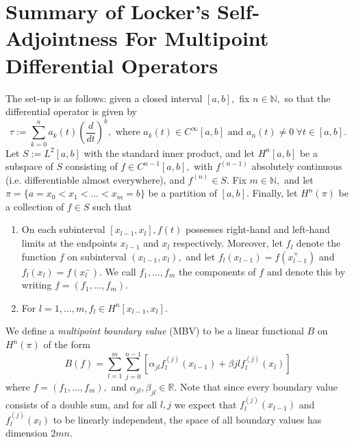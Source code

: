 \documentclass[11pt,reqno,oneside,a4paper]{article}
\begin{document}
	
\section*{Summary of Locker's Self-Adjointness For Multipoint Differential Operators}
The set-up is as follows: given a closed interval $[a,b],$ fix $n\in\mathbb{N},$ so that the differential operator is given by 
\[ 
\tau  := \sum^n_{k=0} a_k(t)\left( \frac{d}{dt}\right)^k, \mbox{ where } a_k(t) \in C^{\infty}[a,b] \mbox{ and } a_n(t) \neq 0~ \forall t \in [a,b].
\]
Let $S := L^2[a,b]$ with the standard inner product, and let $H^n[a,b]$ be a subspace of $S$ consisting of $f\in C^{n-1}[a,b],$ with $f^{(n-1)}$ absolutely continuous (i.e. differentiable almost everywhere), and $f^{(n)} \in S.$ Fix $m \in \mathbb{N},$ and let $\pi = \{ a = x_0 < x_1 < \ldots < x_m = b \}$ be a partition of $[a,b].$ Finally, let $H^n(\pi)$ be a collection of $f \in S$ such that 
\begin{enumerate}
\item On each subinterval $[x_{l-1}, x_l], f(t)$ possesses right-hand and left-hand limits at the endpoints $x_{l-1}$ and $x_{l}$ respectively. Moreover, let $f_l$ denote the function $f$ on subinterval $(x_{l-1}, x_l),$ and let $f_l(x_{l-1}) = f(x_{l-1}^+)$ and $f_l(x_{l}) = f(x_{l}^-).$ We call $f_1, \ldots, f_m$ the components of $f$ and denote this by writing $f = (f_1, \ldots ,f_m).$
\item For $l = 1, \ldots, m, f_l \in H^n[x_{l-1}, x_l].$  
\end{enumerate}

We define a \emph{multipoint boundary value} (MBV) to be a linear functional $B$ on $H^n(\pi)$ of the form
\[ 
B(f) = \sum^{m}_{l=1} \sum^{n-1}_{j=0}[\alpha_{jl} f_l^{(j)}(x_{l-1}) + \beta{jl} f_l^{(j)}(x_{l})]
\]
where $f = (f_1, \ldots ,f_m),$ and $\alpha_{jl}, \beta_{jl} \in \mathbb{R}.$ Note that since every boundary value consists of a double sum, and for all $l,j$ we expect that $f_l^{(j)}(x_{l-1})$ and $f_l^{(j)}(x_{l})$ to be linearly independent, the space of all boundary values has dimension $2mn.$
\end{document}
